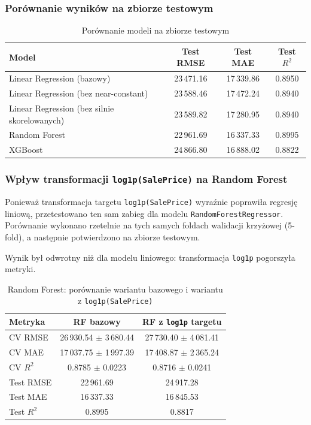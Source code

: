 \documentclass[12pt, a4paper]{article}
\begin{document}
\subsubsection*{Porównanie wyników na zbiorze testowym}

\begin{table}[H]
\centering
\caption{Porównanie modeli na zbiorze testowym}
\label{tab:regression_test_compare}
\begin{tabular}{|l|c|c|c|}
\hline
\textbf{Model} & \textbf{Test RMSE} & \textbf{Test MAE} & \textbf{Test $R^2$} \\
\hline
Linear Regression (bazowy) & 23\,471.16 & 17\,339.86 & 0.8950 \\
Linear Regression (bez near-constant) & 23\,588.46 & 17\,472.24 & 0.8940 \\
Linear Regression (bez silnie skorelowanych) & 23\,589.82 & 17\,280.95 & 0.8940 \\
Random Forest & 22\,961.69 & 16\,337.33 & 0.8995 \\
XGBoost & 24\,866.80 & 16\,888.02 & 0.8822 \\
\hline
\end{tabular}
\end{table}

\subsubsection*{Wpływ transformacji \texttt{log1p(SalePrice)} na Random Forest}

Ponieważ transformacja targetu \texttt{log1p(SalePrice)} wyraźnie poprawiła regresję liniową, przetestowano ten sam zabieg dla modelu \texttt{RandomForestRegressor}. Porównanie wykonano rzetelnie na tych samych foldach walidacji krzyżowej (5-fold), a następnie potwierdzono na zbiorze testowym.

Wynik był odwrotny niż dla modelu liniowego: transformacja \texttt{log1p} pogorszyła metryki.
\begin{table}[H]
\centering
\caption{Random Forest: porównanie wariantu bazowego i wariantu z \texttt{log1p(SalePrice)}}
\label{tab:rf_log_target_compare}
\begin{tabular}{|l|c|c|}
\hline
\textbf{Metryka} & \textbf{RF bazowy} & \textbf{RF z \texttt{log1p} targetu} \\
\hline
CV RMSE & 26\,930.54 $\pm$ 3\,680.44 & 27\,730.40 $\pm$ 4\,081.41 \\
CV MAE & 17\,037.75 $\pm$ 1\,997.39 & 17\,408.87 $\pm$ 2\,365.24 \\
CV $R^2$ & 0.8785 $\pm$ 0.0223 & 0.8716 $\pm$ 0.0241 \\
Test RMSE & 22\,961.69 & 24\,917.28 \\
Test MAE & 16\,337.33 & 16\,845.53 \\
Test $R^2$ & 0.8995 & 0.8817 \\
\hline
\end{tabular}
\end{table}
\end{document}
